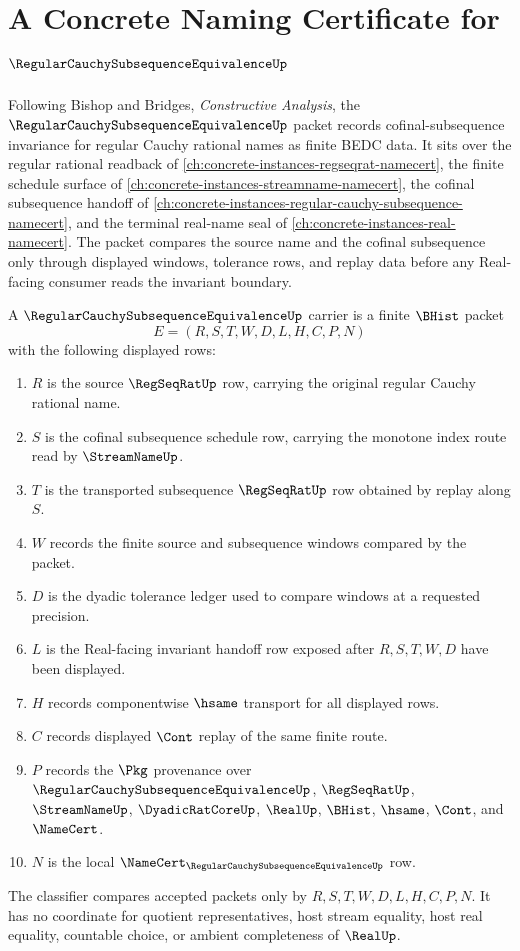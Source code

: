 \chapter{A Concrete Naming Certificate for $\RegularCauchySubsequenceEquivalenceUp$}
\label{ch:concrete-instances-regular-cauchy-subsequence-equivalence-namecert}

Following Bishop and Bridges, \emph{Constructive Analysis}, the $\RegularCauchySubsequenceEquivalenceUp$ packet records cofinal-subsequence invariance for regular Cauchy rational names as finite BEDC data. It sits over the regular rational readback of \autoref{ch:concrete-instances-regseqrat-namecert}, the finite schedule surface of \autoref{ch:concrete-instances-streamname-namecert}, the cofinal subsequence handoff of \autoref{ch:concrete-instances-regular-cauchy-subsequence-namecert}, and the terminal real-name seal of \autoref{ch:concrete-instances-real-namecert}. The packet compares the source name and the cofinal subsequence only through displayed windows, tolerance rows, and replay data before any Real-facing consumer reads the invariant boundary.

\begin{definition}
\label{def:regular-cauchy-subsequence-equivalence-carrier}
A $\RegularCauchySubsequenceEquivalenceUp$ carrier is a finite $\BHist$ packet
$$
E=(R,S,T,W,D,L,H,C,P,N)
$$
with the following displayed rows:
\begin{enumerate}
\item $R$ is the source $\RegSeqRatUp$ row, carrying the original regular Cauchy rational name.
\item $S$ is the cofinal subsequence schedule row, carrying the monotone index route read by $\StreamNameUp$.
\item $T$ is the transported subsequence $\RegSeqRatUp$ row obtained by replay along $S$.
\item $W$ records the finite source and subsequence windows compared by the packet.
\item $D$ is the dyadic tolerance ledger used to compare windows at a requested precision.
\item $L$ is the Real-facing invariant handoff row exposed after $R,S,T,W,D$ have been displayed.
\item $H$ records componentwise $\hsame$ transport for all displayed rows.
\item $C$ records displayed $\Cont$ replay of the same finite route.
\item $P$ records the $\Pkg$ provenance over $\RegularCauchySubsequenceEquivalenceUp$, $\RegSeqRatUp$, $\StreamNameUp$, $\DyadicRatCoreUp$, $\RealUp$, $\BHist$, $\hsame$, $\Cont$, and $\NameCert$.
\item $N$ is the local $\NameCert_{\RegularCauchySubsequenceEquivalenceUp}$ row.
\end{enumerate}
The classifier compares accepted packets only by $R,S,T,W,D,L,H,C,P,N$. It has no coordinate for quotient representatives, host stream equality, host real equality, countable choice, or ambient completeness of $\RealUp$.
\end{definition}

